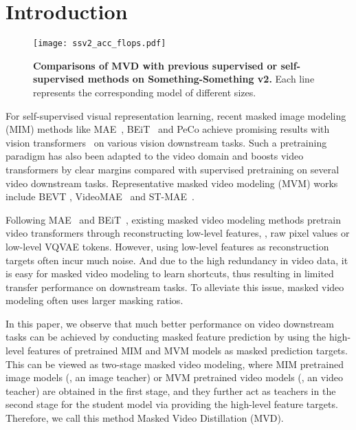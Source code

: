 \documentclass[10pt,twocolumn,letterpaper]{article}
\begin{document}
\section{Introduction}
\label{sec:intro}

\begin{figure}
    \centering
    \texttt{[image: ssv2\_acc\_flops.pdf]}
    \vspace{-0.5em}
    \caption{\textbf{Comparisons of MVD with previous supervised or self-supervised methods on Something-Something v2.} Each line represents the corresponding model of different sizes.}\label{fig:flops_acc_compare}\end{figure}

For self-supervised visual representation learning, recent masked image modeling (MIM) methods like MAE~\cite{he2021masked}, BEiT~\cite{bao2021beit} and PeCo \cite{dong2021peco} achieve promising results with vision transformers~\cite{vit} on various vision downstream tasks. Such a pretraining paradigm has also been adapted to the video domain and boosts video transformers by clear margins compared with supervised pretraining on several video downstream tasks. Representative masked video modeling (MVM) works include BEVT \cite{wang2022bevt}, VideoMAE~\cite{tong2022videomae} and ST-MAE~\cite{feichtenhofer2022masked}.

Following MAE~\cite{he2021masked} and BEiT~\cite{bao2021beit},  existing masked video modeling methods \cite{feichtenhofer2022masked,wang2022bevt,tong2022videomae} pretrain video transformers through reconstructing low-level features, \eg, raw pixel values or low-level VQVAE tokens. However, using low-level features as reconstruction targets often incur much noise. And due to the high redundancy in video data, it is easy for masked video modeling to learn shortcuts, thus resulting in limited transfer performance on downstream tasks. To alleviate this issue, masked video modeling \cite{tong2022videomae} often uses larger masking ratios. 

In this paper, we observe that much better performance on video downstream tasks can be achieved by conducting masked feature prediction by using the high-level features of pretrained MIM and MVM models as masked prediction targets. This can be viewed as two-stage masked video modeling, where MIM pretrained image models (\ie, an image teacher) or MVM pretrained video models (\ie, an video teacher) are obtained in the first stage, and they further act as teachers in the second stage for the student model via providing the high-level feature targets. Therefore, we call this method Masked Video Distillation (MVD). 
\end{document}

